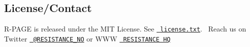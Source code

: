 \subsection*{License/\+Contact}

R-\/\+P\+A\+GE is released under the M\+IT License. See \href{license.txt}{\texttt{ license.\+txt}}.~\newline
 Reach us on Twitter \href{https://twitter.com/RESISTANCE_NO}{\texttt{ @\+R\+E\+S\+I\+S\+T\+A\+N\+C\+E\+\_\+\+NO}} or W\+WW \href{https://resistance.no/}{\texttt{ R\+E\+S\+I\+S\+T\+A\+N\+CE HQ}} 